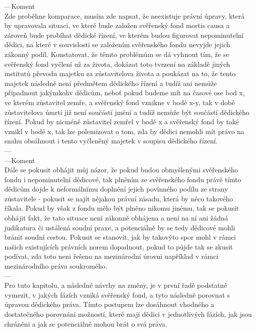 \documentclass{article}
\begin{document}
---Koment\\
Zde proběhne komparace, musím zde napsat, že neexistuje právní úpravy, která by upravovala situaci, ve které bude založen svěřenský fond mortis causa a zároveň bude probíhat dědické řízení, ve kterém budou figurovat nepominutelní dědici, na které v souvislosti se založením svěřenského fondu nevyjde jejich zákonný podíl. Konstatovat, že těmto problémům se dá vyhnout tím, že se svěřenský fond vyčlení už za života, dokázat toto tvrzení na základě jiných institutů převodu majetku za zůstavitelova života a poukázat na to, že tento majetek následně není předmětem dědického řízení a tudíž ani nemůže připadnout jakýmkoliv dědicům, neboť pokud budeme mít na časové ose bod x, ve kterém zůstavitel zemře, a svěřenský fond vznikne v bodě x-y, tak v době zůstavitelova úmrtí již není součástí jmění a tudíž nemůže být součástí dědického řízení. Pokud by nicméně zůstavitel zemřel v bodě x a svěřenský fond by také vznikl v bodě x, tak lze polemizovat o tom, zda by dědici nemohli mít právo na snahu obsáhnout i tento vyčleněný majetek v soupisu dědického řízení.\\
---\\

---Koment\\
Dále se pokusit obhájit můj názor, že pokud budou obmyšlenými svěřenského fondu i nepominutelní dědicové, tak plněním ze svěřenského fondu právě tímto dědicům dojde k neformálnímu doplnění jejich povinného podílu ze strany zůstavitele - pokusit se najít nějakou právní zásadu, která by něco takového říkala. Pokud by však z fondu mělo být plněno nikomu jinému, tak se pokusit obhájit fakt, že tato situace není zákonně obhájena a není na ní ani žádná judikatura či ustálená soudní praxe, a potenciálně by se tedy dědicové mohli bránit soudní cestou. Pokusit se stanovit, jak by takovýto spor mohl v rámci našich existujících právních norem dopadnout, pokud to půjde tak se zkusit podívat, zda toto neni řešeno na mezinárodní úrovni například v rámci mezinárodního práva soukromého. \\
---\\

Pro tuto kapitolu, a následné návrhy na změny, je v první řadě podstatné vymezit,  v jakých fázích vzniká svěřenský fond, a tyto následně porovnat s úpravou dědického práva. Tímto postupem lze dosáhnout vhodného a dostatečného porovnání možností, které mají dědici v jednotlivých fázích, jak jsou chráněni a jak se potenciálně mohou brát o svá práva. \\ 
\end{document}
